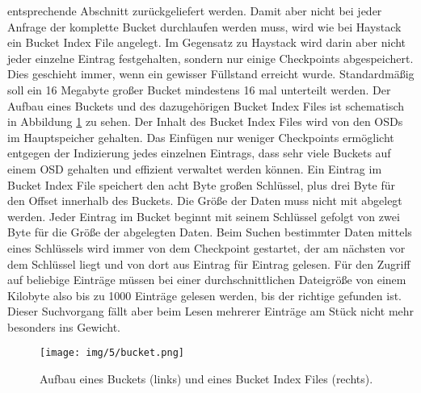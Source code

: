\documentclass[12pt,oneside,a4paper,parskip]{scrbook}
\begin{document}
entsprechende Abschnitt zurückgeliefert werden. Damit aber nicht bei jeder Anfrage der komplette Bucket durchlaufen werden muss, wird wie bei Haystack ein Bucket Index File angelegt. Im Gegensatz zu Haystack wird darin aber nicht jeder einzelne Eintrag festgehalten, sondern nur einige Checkpoints abgespeichert. Dies geschieht immer, wenn ein gewisser Füllstand erreicht wurde. Standardmäßig soll ein 16 Megabyte großer Bucket mindestens 16 mal unterteilt werden. Der Aufbau eines Buckets und des dazugehörigen Bucket Index Files ist schematisch in Abbildung \ref{bucket} zu sehen. Der Inhalt des Bucket Index Files wird von den OSDs im Hauptspeicher gehalten. Das Einfügen nur weniger Checkpoints ermöglicht entgegen der Indizierung jedes einzelnen Eintrags, dass sehr viele Buckets auf einem OSD gehalten und effizient verwaltet werden können. Ein Eintrag im Bucket Index File speichert den acht Byte großen Schlüssel, plus drei Byte für den Offset innerhalb des Buckets. Die Größe der Daten muss nicht mit abgelegt werden. Jeder Eintrag im Bucket beginnt mit seinem Schlüssel gefolgt von zwei Byte für die Größe der abgelegten Daten. Beim Suchen bestimmter Daten mittels eines Schlüssels wird immer von dem Checkpoint gestartet, der am nächsten vor dem Schlüssel liegt und von dort aus Eintrag für Eintrag gelesen. Für den Zugriff auf beliebige Einträge müssen bei einer durchschnittlichen Dateigröße von einem Kilobyte also bis zu 1000 Einträge gelesen werden, bis der richtige gefunden ist. Dieser Suchvorgang fällt aber beim Lesen mehrerer Einträge am Stück nicht mehr besonders ins Gewicht.

\begin{figure}
  \centering
  \texttt{[image: img/5/bucket.png]}
  \caption[Aufbau eines Buckets und dem Bucket Index Files]{ Aufbau eines Buckets (links) und eines Bucket Index Files (rechts).}
  \label{bucket}
\end{figure}
\end{document}
